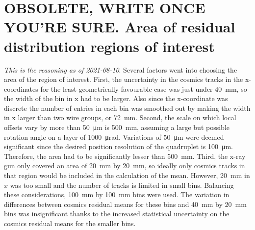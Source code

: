 \section{OBSOLETE, WRITE ONCE YOU'RE SURE. Area of residual distribution regions of interest}
\label{appendix:systematics_bin_size}

\textit{This is the reasoning as of 2021-08-10}.
Several factors went into choosing the area of the region of interest. First, the uncertainty in the cosmics tracks in the x-coordinates for the least geometrically favourable case was just under \SI{40}{\milli\meter}, so the width of the bin in x had to be larger. Also since the x-coordinate was discrete the number of entries in each bin was smoothed out by making the width in x larger than two wire groups, or \SI{72}{\milli\meter}. Second, the scale on which local offsets vary by more than \SI{50}{\micro\meter} is \SI{500}{\milli\meter}, assuming a large but possible rotation angle on a layer of \SI{1000}{\micro\radian}. Variations of \SI{50}{\micro\meter} were deemed significant since the desired position resolution of the quadruplet is \SI{100}{\micro\meter}. Therefore, the area had to be significantly lesser than \SI{500}{\milli\meter}. Third, the x-ray gun only covered an area of \SI{20}{\milli\meter} by \SI{20}{\milli\meter}, so ideally only cosmics tracks in that region would be included in the calculation of the mean. However, \SI{20}{\milli\meter} in $x$ was too small and the number of tracks is limited in small bins. Balancing these considerations, \SI{100}{\milli\meter} by \SI{100}{\milli\meter} bins were used. The variation in differences between cosmics residual means for these bins and \SI{40}{\milli\meter} by \SI{20}{\milli\meter} bins was insignificant thanks to the increased statistical uncertainty on the cosmics residual means for the smaller bins.

